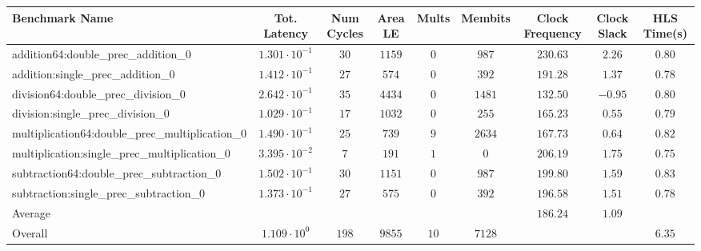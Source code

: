 \begin{tabular}{|l|c|c|c|c|c|c|c|c|}
\hline
Benchmark Name                                   & Tot. Latency            & Num Cycles & Area LE  & Mults  & Membits  & Clock Frequency & Clock Slack & HLS Time(s) \\
\hline
addition64:double\_prec\_addition\_0             & $ 1.301 \cdot 10^{-1} $ & $ 30     $ & $ 1159 $ & $ 0  $ & $ 987  $ & $ 230.63      $ & $ 2.26    $ & $ 0.80    $ \\
addition:single\_prec\_addition\_0               & $ 1.412 \cdot 10^{-1} $ & $ 27     $ & $ 574  $ & $ 0  $ & $ 392  $ & $ 191.28      $ & $ 1.37    $ & $ 0.78    $ \\
division64:double\_prec\_division\_0             & $ 2.642 \cdot 10^{-1} $ & $ 35     $ & $ 4434 $ & $ 0  $ & $ 1481 $ & $ 132.50      $ & $ -0.95   $ & $ 0.80    $ \\
division:single\_prec\_division\_0               & $ 1.029 \cdot 10^{-1} $ & $ 17     $ & $ 1032 $ & $ 0  $ & $ 255  $ & $ 165.23      $ & $ 0.55    $ & $ 0.79    $ \\
multiplication64:double\_prec\_multiplication\_0 & $ 1.490 \cdot 10^{-1} $ & $ 25     $ & $ 739  $ & $ 9  $ & $ 2634 $ & $ 167.73      $ & $ 0.64    $ & $ 0.82    $ \\
multiplication:single\_prec\_multiplication\_0   & $ 3.395 \cdot 10^{-2} $ & $ 7      $ & $ 191  $ & $ 1  $ & $ 0    $ & $ 206.19      $ & $ 1.75    $ & $ 0.75    $ \\
subtraction64:double\_prec\_subtraction\_0       & $ 1.502 \cdot 10^{-1} $ & $ 30     $ & $ 1151 $ & $ 0  $ & $ 987  $ & $ 199.80      $ & $ 1.59    $ & $ 0.83    $ \\
subtraction:single\_prec\_subtraction\_0         & $ 1.373 \cdot 10^{-1} $ & $ 27     $ & $ 575  $ & $ 0  $ & $ 392  $ & $ 196.58      $ & $ 1.51    $ & $ 0.78    $ \\
\hline
Average                                          & $                     $ & $        $ & $      $ & $    $ & $      $ & $ 186.24      $ & $ 1.09    $ & $         $ \\
\hline
Overall                                          & $ 1.109 \cdot 10^{0}  $ & $ 198    $ & $ 9855 $ & $ 10 $ & $ 7128 $ & $             $ & $         $ & $ 6.35    $ \\
\hline
\end{tabular}
